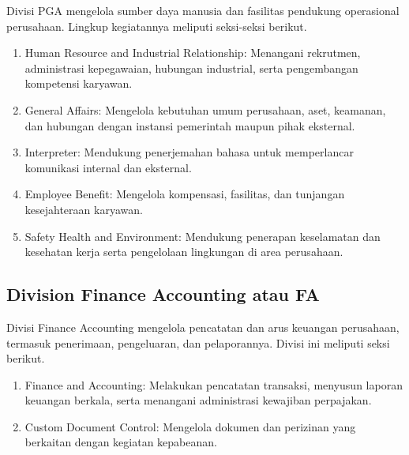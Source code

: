 Divisi PGA mengelola sumber daya manusia dan fasilitas pendukung operasional perusahaan. Lingkup kegiatannya meliputi seksi-seksi berikut.

\begin{enumerate}[leftmargin=*,itemsep=2pt]
\item Human Resource and Industrial Relationship: Menangani rekrutmen, administrasi kepegawaian, hubungan industrial, serta pengembangan kompetensi karyawan.

\item General Affairs: Mengelola kebutuhan umum perusahaan, aset, keamanan, dan hubungan dengan instansi pemerintah maupun pihak eksternal.

\item Interpreter: Mendukung penerjemahan bahasa untuk memperlancar komunikasi internal dan eksternal.

\item Employee Benefit: Mengelola kompensasi, fasilitas, dan tunjangan kesejahteraan karyawan.

\item Safety Health and Environment: Mendukung penerapan keselamatan dan kesehatan kerja serta pengelolaan lingkungan di area perusahaan.

\end{enumerate}

\subsection{Division Finance Accounting atau FA}

Divisi Finance Accounting mengelola pencatatan dan arus keuangan perusahaan, termasuk penerimaan, pengeluaran, dan pelaporannya. Divisi ini meliputi seksi berikut.

\begin{enumerate}[leftmargin=*,itemsep=2pt]
\item Finance and Accounting: Melakukan pencatatan transaksi, menyusun laporan keuangan berkala, serta menangani administrasi kewajiban perpajakan.

\item Custom Document Control: Mengelola dokumen dan perizinan yang berkaitan dengan kegiatan kepabeanan.

\end{enumerate}

